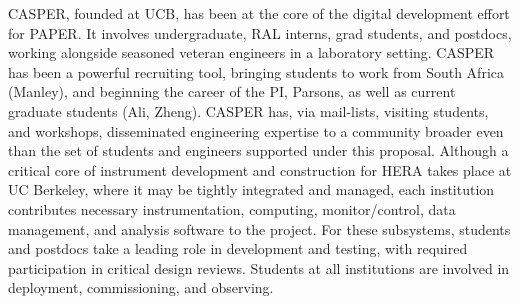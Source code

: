 \documentclass[preprint]{aastex}
\begin{document}
CASPER, founded at UCB, has been at the core of the digital development effort for PAPER.  It involves undergraduate, RAL interns, grad students, and postdocs, working alongside seasoned veteran engineers in a laboratory setting.  CASPER has been a powerful recruiting tool, bringing students to work from South Africa (Manley), and beginning the career of the PI, Parsons, as well as current graduate students (Ali, Zheng).  
CASPER has, via mail-lists, visiting students, and workshops, disseminated engineering expertise to a community broader even than the set of students and engineers supported under this proposal.
Although a critical core of instrument development and construction for HERA takes place at UC Berkeley, where it may be tightly integrated and managed, each institution contributes necessary instrumentation, computing, monitor/control, data management, and analysis software to the project.  For these subsystems, students and postdocs take a leading role in development and testing, with required participation in critical design reviews.  Students at all institutions are involved in deployment, commissioning, and observing.

\end{document}

